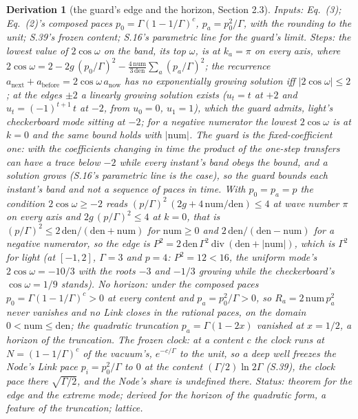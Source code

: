 \documentclass[pdflatex,sn-mathphys-num]{sn-jnl}
\newcommand{\num}{\mathrm{num}}
\newcommand{\den}{\mathrm{den}}
\newcommand{\anow}{a_{\mathrm{now}}}
\newcommand{\abefore}{a_{\mathrm{before}}}
\newcommand{\anext}{a_{\mathrm{next}}}
\newcommand{\ddiv}{\ \mathrm{div}\ }
\theoremstyle{thmstyleone}
\newtheorem{derivation}{Derivation}
\begin{document}
\begin{derivation}[the guard's edge and the horizon, Section 2.3]
\emph{Inputs:} Eq.~(3); Eq.~(2)'s composed paces $p_0 = \Gamma(1 - 1 / \Gamma)^c$, $p_a = p_0^2 / \Gamma$, with the rounding to the unit; S.39's frozen content; S.16's parametric line for the guard's limit. \emph{Steps:} the lowest value of $2\cos\omega$ on the band, its top $\omega$, is at $k_a = \pi$ on every axis, where $2\cos\omega = 2 - 2g\,(p_0 / \Gamma)^2 - \frac{4\,\num}{3\,\den}\sum_a(p_a / \Gamma)^2$; the recurrence $\anext + \abefore = 2\cos\omega\,\anow$ has no exponentially growing solution iff $|2\cos\omega| \le 2$; at the edges $\pm 2$ a linearly growing solution exists ($u_t = t$ at $+2$ and $u_t = (-1)^{t + 1}\,t$ at $-2$, from $u_0 = 0$, $u_1 = 1$), which the guard admits, light's checkerboard mode sitting at $-2$; for a negative numerator the lowest $2\cos\omega$ is at $k = 0$ and the same bound holds with $|\num|$. The guard is the fixed-coefficient one: with the coefficients changing in time the product of the one-step transfers can have a trace below $-2$ while every instant's band obeys the bound, and a solution grows (S.16's parametric line is the case), so the guard bounds each instant's band and not a sequence of paces in time. With $p_0 = p_a = p$ the condition $2\cos\omega \ge -2$ reads $(p / \Gamma)^2\,(2g + 4\,\num / \den) \le 4$ at wave number $\pi$ on every axis and $2g\,(p / \Gamma)^2 \le 4$ at $k = 0$, that is $(p / \Gamma)^2 \le 2\,\den / (\den + \num)$ for $\num \ge 0$ and $2\,\den / (\den - \num)$ for a negative numerator, so the edge is $P^2 = 2\,\den\,\Gamma^2 \ddiv (\den + |\num|)$, which is $\Gamma^2$ for light (at $[-1, 2]$, $\Gamma = 3$ and $p = 4$: $P^2 = 12 < 16$, the uniform mode's $2\cos\omega = -10 / 3$ with the roots $-3$ and $-1 / 3$ growing while the checkerboard's $\cos\omega = 1 / 9$ stands). \emph{No horizon:} under the composed paces $p_0 = \Gamma(1 - 1 / \Gamma)^c > 0$ at every content and $p_a = p_0^2 / \Gamma > 0$, so $R_a = 2\,\num\,p_a^2$ never vanishes and no Link closes in the rational paces, on the domain $0 < \num \le \den$; the quadratic truncation $p_a = \Gamma(1 - 2x)$ vanished at $x = 1 / 2$, a horizon of the truncation. \emph{The frozen clock:} at a content $c$ the clock runs at $N = (1 - 1 / \Gamma)^c$ of the vacuum's, $e^{-c / \Gamma}$ to the unit, so a deep well freezes the Node's Link pace $p_i = p_0^2 / \Gamma$ to $0$ at the content $(\Gamma / 2)\ln 2\Gamma$ (S.39), the clock pace there $\sqrt{\Gamma / 2}$, and the Node's share is undefined there.
 \emph{Status:} theorem for the edge and the extreme mode; derived for the horizon of the quadratic form, a feature of the truncation; lattice.
\end{derivation}
\end{document}
